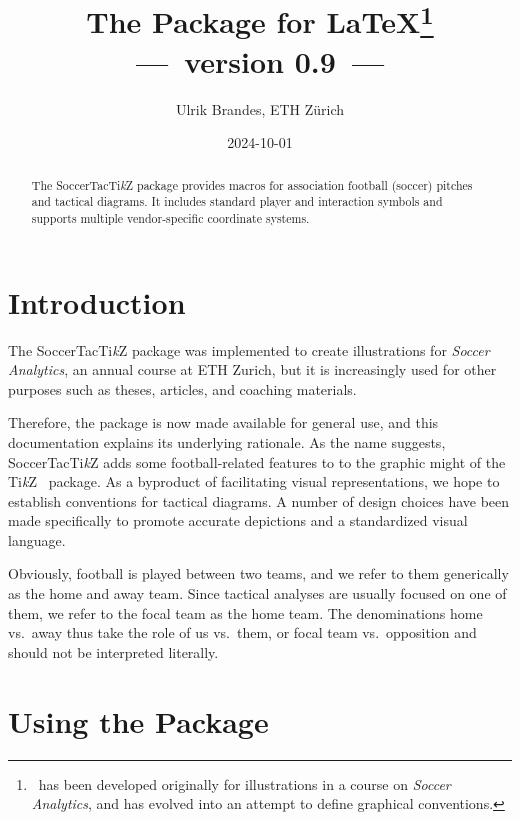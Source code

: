 \documentclass[a4paper,12pt]{ltxdoc}
\title{The \textsf{\SoccerTacTikZ} Package for \LaTeX\thanks{%
\SoccerTacTikZ\ has been developed originally for illustrations 
in a course on \emph{Soccer Analytics},
and has evolved into an attempt to define graphical conventions.}\\
\normalsize ---~version 0.9~---}
\author{Ulrik Brandes, ETH Zürich}
\date{2024-10-01}
\newcommand{\TikZ}{Ti\emph{k}Z}
\newcommand{\SoccerTacTikZ}{SoccerTac\TikZ}
\begin{document}
\maketitle

\begin{abstract}
The \textsf{\SoccerTacTikZ} package provides macros
for association football (soccer) pitches and tactical diagrams. 
It includes standard player and interaction symbols 
and supports multiple vendor-specific coordinate systems.
\end{abstract}
\tableofcontents
\clearpage

\section{Introduction}

The \textsf{\SoccerTacTikZ} package
was implemented to create illustrations
for \emph{Soccer Analytics}, an annual course at ETH Zurich,
but it is increasingly used for other purposes
such as theses, articles, and coaching materials.
 
Therefore, the package is now made available for general use,
and this documentation explains its underlying rationale.
As the name suggests, \textsf{\SoccerTacTikZ}
adds some football-related features to 
to the graphic might of the \TikZ~\cite{tikz} package.
As a byproduct of facilitating visual representations,
we hope to establish conventions for tactical diagrams.
A number of design choices have been made specifically
to promote accurate depictions and a standardized visual language.

Obviously, football is played between two teams, 
and we refer to them generically as the home and away team.
Since tactical analyses are usually focused on one of them,
we refer to the focal team as the home team.
The denominations home vs.\ away thus take the role of
us vs.\ them, or focal team vs.\ opposition
and should not be interpreted literally.


\section{Using the Package}
\end{document}

